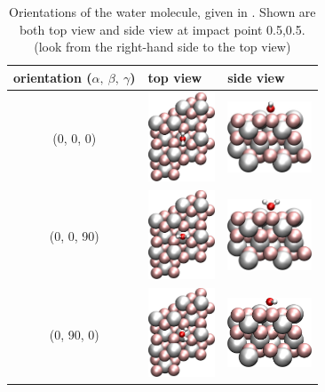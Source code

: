 \documentclass[11pt,DIV=13,BCOR=5mm,a4paper,headinclude]{scrbook}
\begin{document}
 \begin{table}[!h]
 \centering
  \caption{Orientations of the water molecule, given in \textdegree.
Shown are both top view and side view at impact point 0.5,0.5.
(look from the right-hand side to the top view)}
 \begin{tabular}{cp{4cm}p{4cm}}
 \toprule
 orientation ($\alpha,~\beta,~\gamma$)& top view & side view \\\midrule
 (0, 0, 0)  & \includegraphics[width=2cm,angle=90]{figures/0001/Ausrichtungsbilder/0_0_0-toptest.png}
&\includegraphics[width=2.5cm]{figures/0001/Ausrichtungsbilder/0_0_0-sidetest.png}\\
(0, 0, 90)   & \includegraphics[width=2cm,angle=90]{figures/0001/Ausrichtungsbilder/0_0_90-toptest.png}
& \includegraphics[width=2.5cm]{figures/0001/Ausrichtungsbilder/0_0_90-sidetest.png}\\
(0, 90, 0)   & \includegraphics[width=2cm,angle=90]{figures/0001/Ausrichtungsbilder/0_90_0-toptest.png}
& \includegraphics[width=2.5cm]{figures/0001/Ausrichtungsbilder/0_90_0-sidetest.png}\\

\end{tabular}
\end{table}
\end{document}
